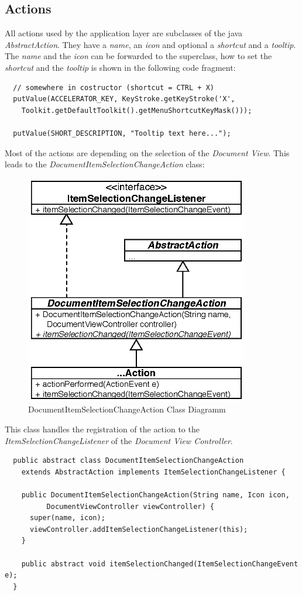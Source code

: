 \subsection{Actions}
All actions used by the application layer are subclasses of the java \textit{AbstractAction}. They have a \textit{name}, an \textit{icon} and optional a \textit{shortcut} and a \textit{tooltip}. The \textit{name} and the \textit{icon} can be forwarded to the superclass, how to set the \textit{shortcut} and the \textit{tooltip} is shown in the following code fragment:
\begin{verbatim}
  // somewhere in costructor (shortcut = CTRL + X)
  putValue(ACCELERATOR_KEY, KeyStroke.getKeyStroke('X',
    Toolkit.getDefaultToolkit().getMenuShortcutKeyMask()));

  putValue(SHORT_DESCRIPTION, "Tooltip text here...");
\end{verbatim}
Most of the actions are depending on the selection of the \textit{Document View}. This leads to the \textit{DocumentItemSelectionChangeAction} class:
\begin{figure}[H]
\begin{center}
  \includegraphics[height=3.97in, width=3.85in]{../images/finalreport/application_action.eps}
\caption{DocumentItemSelectionChangeAction Class Diagramm}
\label{application_application_action}
\end{center}
\end{figure}
This class handles the registration of the action to the \textit{ItemSelectionChangeListener} of  the \textit{Document View Controller}.
\begin{verbatim}
  public abstract class DocumentItemSelectionChangeAction
    extends AbstractAction implements ItemSelectionChangeListener {
  
    public DocumentItemSelectionChangeAction(String name, Icon icon,
          DocumentViewController viewController) {
      super(name, icon);
      viewController.addItemSelectionChangeListener(this);
    }
    
    public abstract void itemSelectionChanged(ItemSelectionChangeEvent e);
  }
\end{verbatim}



